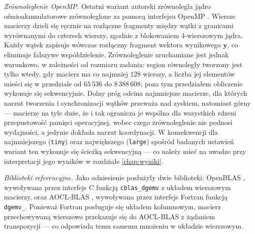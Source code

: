 \documentclass[a4paper,12pt]{book} %
\begin{document}
\emph{Zrównoleglenie OpenMP.} Ostatni wariant autorski zrównolegla jądro ośmioakumulatorowe zrównoleglone za pomocą interfejsu OpenMP \cite{openmp52}. Wiersze macierzy dzieli się ręcznie na rozłączne fragmenty między wątki z granicami wyrównanymi do czterech wierszy, zgodnie z blokowaniem 4-wierszowym jądra. Każdy wątek zapisuje wówczas rozłączny fragment wektora wynikowego $\mathbf{y}$, co eliminuje fałszywe współdzielenie. Zrównoleglenie uruchamiane jest jednak warunkowo, w zależności od rozmiaru zadania: region równoległy tworzony jest tylko wtedy, gdy macierz ma co najmniej $128$ wierszy, a liczba jej elementów mieści się w przedziale od $65\,536$ do $8\,388\,608$; poza tym przedziałem obliczenie wykonuje się sekwencyjnie. Dolny próg odcina najmniejsze macierze, dla których narzut tworzenia i synchronizacji wątków przeważa nad zyskiem, natomiast górny --- macierze na tyle duże, że i tak ogranicza je wspólna dla wszystkich rdzeni przepustowość pamięci operacyjnej, wobec czego zrównoleglenie nie podnosi wydajności, a jedynie dokłada narzut koordynacji. W konsekwencji dla najmniejszego (\texttt{tiny}) oraz największego (\texttt{large}) spośród badanych ustawień wariant ten wykonuje się ścieżką sekwencyjną --- co należy mieć na uwadze przy interpretacji jego wyników w rozdziale \ref{chap:wyniki}.

\emph{Biblioteki referencyjne.} Jako odniesienie posłużyły dwie biblioteki: OpenBLAS \cite{zhang2012openblas}, wywoływana przez interfejs C funkcją \texttt{cblas\_dgemv} z układem wierszowym macierzy, oraz AOCL-BLAS \cite{amd_aocl_blas}, wywoływana przez interfejs Fortran funkcją \texttt{dgemv\_}. Ponieważ Fortran posługuje się układem kolumnowym, macierz przechowywaną wierszowo przekazuje się do AOCL-BLAS z żądaniem transpozycji --- co odpowiada temu samemu mnożeniu w układzie wierszowym.
\end{document}
